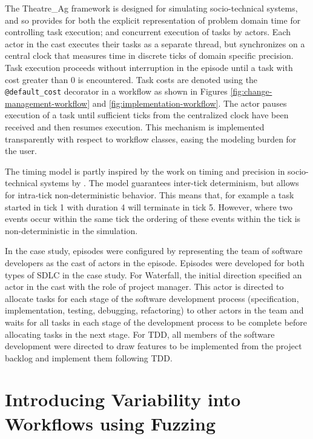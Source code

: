 \documentclass{llncs}
\begin{document}
The Theatre\_Ag framework is designed for simulating socio-technical systems, and so provides for both the explicit
representation of problem domain time for controlling task execution; and concurrent execution of tasks by actors.  Each
actor in the cast executes their tasks as a separate thread, but synchronizes on a central clock that measures time in
discrete ticks of domain specific precision.  Task execution proceeds without interruption in the episode until a task
with cost greater than 0 is encountered.  Task costs are denoted using the \lstinline!@default_cost! decorator in a
workflow as shown in Figures \ref{fig:change-management-workflow} and \ref{fig:implementation-workflow}.  The actor
pauses execution of a task until sufficient ticks from the centralized clock have been received and then resumes
execution.  This mechanism is implemented transparently with respect to workflow classes, easing the modeling burden for
the user.

The timing model is partly inspired by the work on timing and precision in socio-technical systems by
\citet{baxter07evaluating}.  The model guarantees inter-tick determinism, but allows for intra-tick non-deterministic
behavior.  This means that, for example a task started in tick 1 with duration 4 will terminate in tick 5.  However,
where two events occur within the same tick the ordering of these events within the tick is non-deterministic in the
simulation.

In the case study, episodes were configured by representing the team of software developers as the cast of actors in the
episode.  Episodes were developed for both types of SDLC in the case study.  For Waterfall, the initial direction
specified an actor in the cast with the role of project manager.  This actor is directed to allocate tasks for each
stage of the software development process (specification, implementation, testing, debugging, refactoring) to other
actors in the team and waits for all tasks in each stage of the development process to be complete before allocating
tasks in the next stage.  For TDD, all members of the software development were directed to draw features to be
implemented from the project backlog and implement them following TDD.


\section{Introducing Variability into Workflows using Fuzzing}
\label{sec:fuzzing}
\end{document}
